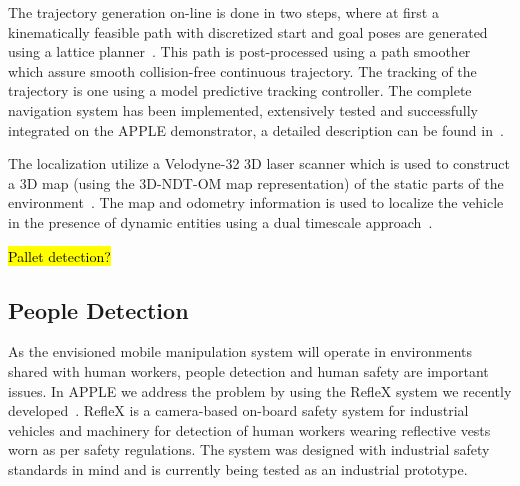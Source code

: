 The trajectory generation on-line is done in two steps, where at first a kinematically feasible path with discretized start and goal poses are generated using a lattice planner~\cite{Ciri14}. This path is post-processed using a path smoother~\cite{Andr15} which assure smooth collision-free continuous trajectory. The tracking of the trajectory is one using a model predictive tracking controller. The complete navigation system has been implemented, extensively tested and successfully
integrated on the APPLE demonstrator, a detailed description can be found in~\cite{Andr15}.

The localization utilize a Velodyne-32 3D laser scanner which is used to construct a 3D map (using the 3D-NDT-OM map representation) of the static parts of the environment~\cite{Stoy13}. The map and odometry information is used to localize the vehicle in the presence of dynamic entities using a dual timescale approach~\cite{Vale14}. 



\hl{Pallet detection?}

%
\subsection{People Detection}
\label{subsec:people_det}
%
As the envisioned mobile manipulation system will operate in environments shared with human workers,
people detection and human safety are important issues. In APPLE we address the problem by using the
RefleX system we recently developed~\cite{Mosb14}. RefleX is a camera-based on-board safety system
for industrial vehicles and machinery for detection of human workers wearing reflective vests worn
as per safety regulations. The system was designed with industrial safety standards in mind and is
currently being tested as an industrial prototype.
%
